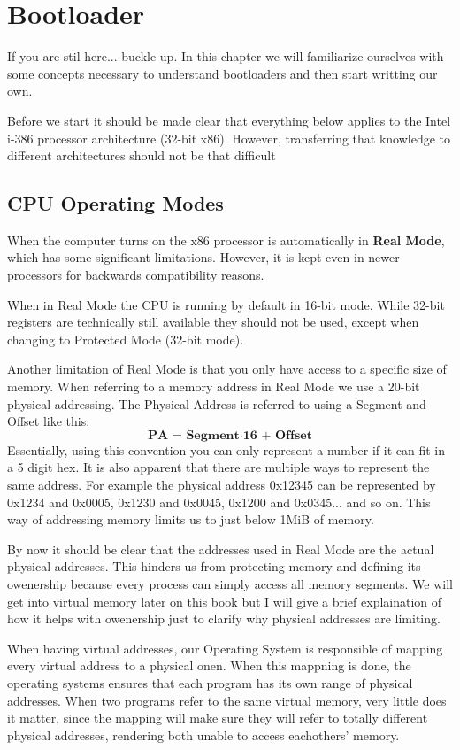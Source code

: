 \chapter{Bootloader}

If you are stil here... buckle up. In this chapter we will familiarize ourselves with some concepts necessary to understand bootloaders
and then start writting our own.

Before we start it should be made clear that everything below applies to the Intel i-386 processor architecture (32-bit x86).
However, transferring that knowledge to different architectures should not be that difficult

\section{CPU Operating Modes}

When the computer turns on the x86 processor is automatically in \textbf{Real Mode}, which has some significant limitations. However,
it is kept even in newer processors for backwards compatibility reasons. 

When in Real Mode the CPU is running by default in 16-bit mode. While 32-bit registers are technically still available they 
should not be used, except when changing to Protected Mode (32-bit mode).

Another limitation of Real Mode is that you only have access to a specific size of memory. When referring to a memory 
address in Real Mode we use a 20-bit physical addressing. The Physical Address is referred to using a Segment and Offset like this: 
\[
\textbf{PA = Segment} \cdot \textbf{16 + Offset}
\]
Essentially, using this convention you can only represent a number if it can fit in a 5 digit hex. It is also apparent that
there are multiple ways to represent the same address. For example the physical address 0x12345 can be represented 
by 0x1234 and 0x0005, 0x1230 and 0x0045, 0x1200 and 0x0345... and so on. This way of addressing memory limits us to just 
below 1MiB of memory.

By now it should be clear that the addresses used in Real Mode are the actual physical addresses. This hinders us from protecting
memory and defining its owenership because every process can simply access all memory segments. We will get into virtual memory 
later on this book but I will give a brief explaination of how it helps with owenership just to clarify why physical 
addresses are limiting.

When having virtual addresses, our Operating System is responsible of mapping every virtual address to a physical onen.
When this mappning is done, the operating systems ensures that each program has its own range of physical addresses.
When two programs refer to the same virtual memory, very little does it matter, since the mapping will make sure they 
will refer to totally different physical addresses, rendering both unable to access eachothers' memory.

